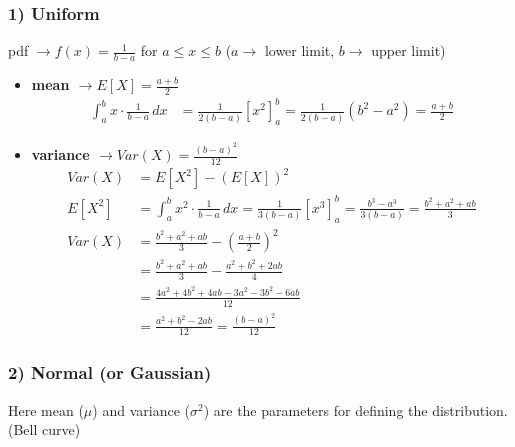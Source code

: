 \documentclass[11pt,a4paper]{article}
\begin{document}
\subsubsection*{1) Uniform}
pdf $\rightarrow f(x) = \frac{1}{b-a}$ for $a \leq x \leq b$ ($a \rightarrow$ lower limit, $b \rightarrow$ upper limit)
\begin{itemize}
    \item \textbf{mean $\rightarrow E[X] = \frac{a+b}{2}$}
    \begin{align*}
        \int_a^b x \cdot \frac{1}{b-a} \, dx &= \frac{1}{2(b-a)} [x^2]_a^b = \frac{1}{2(b-a)} (b^2 - a^2) = \frac{a+b}{2}
    \end{align*}
    \item \textbf{variance $\rightarrow Var(X) = \frac{(b-a)^2}{12}$}
    \begin{align*}
        Var(X) &= E[X^2] - (E[X])^2 \\
        E[X^2] &= \int_a^b x^2 \cdot \frac{1}{b-a} \, dx = \frac{1}{3(b-a)} [x^3]_a^b = \frac{b^3 - a^3}{3(b-a)} = \frac{b^2 + a^2 + ab}{3} \\
        Var(X) &= \frac{b^2 + a^2 + ab}{3} - \left(\frac{a+b}{2}\right)^2 \\
        &= \frac{b^2 + a^2 + ab}{3} - \frac{a^2 + b^2 + 2ab}{4} \\
        &= \frac{4a^2 + 4b^2 + 4ab - 3a^2 - 3b^2 - 6ab}{12} \\
        &= \frac{a^2 + b^2 - 2ab}{12} = \frac{(b-a)^2}{12}
    \end{align*}
\end{itemize}

\subsubsection*{2) Normal (or Gaussian)}
Here mean ($\mu$) and variance ($\sigma^2$) are the parameters for defining the distribution. (Bell curve)
\end{document}
